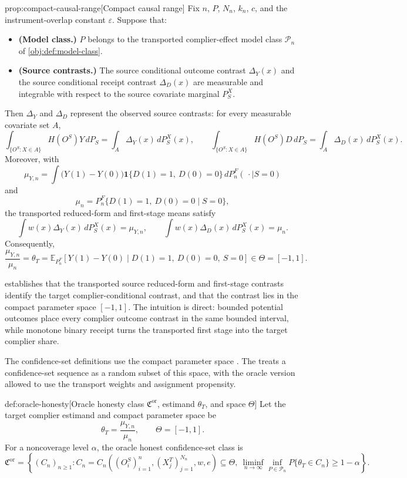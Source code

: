 \documentclass[11pt]{article}
\begin{document}
\begin{theoremv}{prop:compact-causal-range}[Compact causal range]
Fix \(n\), \(P\), \(N_n\), \(k_n\), \(c\), and the instrument-overlap constant \(\varepsilon\). Suppose that:
\begin{itemize}
\item \textbf{(Model class.)} \(P\) belongs to the transported complier-effect model class \(\mathcal P_n\) of \cref{obj:def:model-class}.
\item \textbf{(Source contrasts.)} The source conditional outcome contrast \(\Delta_Y(x)\) and the source conditional receipt contrast \(\Delta_D(x)\) are measurable and integrable with respect to the source covariate marginal \(P_S^X\).
\end{itemize}
Then \(\Delta_Y\) and \(\Delta_D\) represent the observed source contrasts: for every measurable covariate set \(A\),
\[
\int_{\{O^S:X\in A\}} H(O^S)Y\,dP_S
=
\int_A \Delta_Y(x)\,dP_S^X(x),
\qquad
\int_{\{O^S:X\in A\}} H(O^S)D\,dP_S
=
\int_A \Delta_D(x)\,dP_S^X(x).
\]
Moreover, with
\[
\mu_{Y,n}
=
\int \bigl(Y(1)-Y(0)\bigr)\mathbf 1\{D(1)=1,\ D(0)=0\}\,dP_n^F(\,\cdot\mid S=0)
\]
and
\[
\mu_n
=
P_n^F\{D(1)=1,\ D(0)=0\mid S=0\},
\]
the transported reduced-form and first-stage means satisfy
\[
\int w(x)\Delta_Y(x)\,dP_S^X(x)=\mu_{Y,n},
\qquad
\int w(x)\Delta_D(x)\,dP_S^X(x)=\mu_n.
\]
Consequently,
\[
\frac{\mu_{Y,n}}{\mu_n}
=
\theta_T
=
\mathbb E_{P_n^F}\!\left[Y(1)-Y(0)\mid D(1)=1,\ D(0)=0,\ S=0\right]
\in \Theta=[-1,1].
\]
\end{theoremv}

 establishes that the transported source reduced-form and first-stage contrasts identify the target complier-conditional contrast, and that the contrast lies in the compact parameter space \([-1,1]\). The intuition is direct: bounded potential outcomes place every complier outcome contrast in the same bounded interval, while monotone binary receipt turns the transported first stage into the target complier share.

The confidence-set definitions use the compact parameter space . The  treats a confidence-set sequence as a random subset of this space, with the oracle version allowed to use the transport weights and assignment propensity.

\begin{definitionv}{def:oracle-honesty}[Oracle honesty class $\mathfrak C^{\mathrm{or}}$, estimand $\theta_T$, and space $\Theta$]
Let the target complier estimand and compact parameter space be
\[
\theta_T=\frac{\mu_{Y,n}}{\mu_n},
\qquad
\Theta=[-1,1].
\]
For a noncoverage level \(\alpha\), the oracle honest confidence-set class is
\[
\mathfrak C^{\mathrm{or}}
=
\left\{
(C_n)_{n\ge 1} :
C_n
=
C_n\!\left((O_i^S)_{i=1}^n,(X_j^T)_{j=1}^{N_n},w,e\right)
\subseteq \Theta,\ 
\liminf_{n\to\infty}\inf_{P\in\mathcal P_n}
P\{\theta_T\in C_n\}
\ge 1-\alpha
\right\}.
\]
\end{definitionv}
\end{document}
